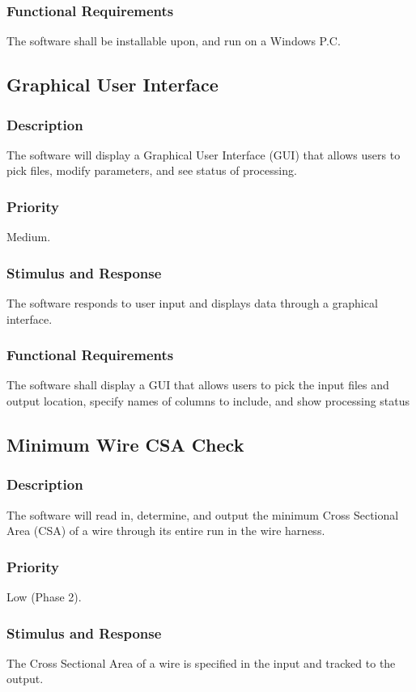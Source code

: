 \subsubsection{Functional Requirements}
The software shall be installable upon, and run on a Windows P.C.

  \subsection{Graphical User Interface}
\subsubsection{Description}
 The software will display a Graphical User Interface (GUI) that allows users to pick files, modify parameters, and see status of processing. 
\subsubsection{Priority}
Medium.

\subsubsection{Stimulus and Response}
The software responds to user input and displays data through a graphical interface.

\subsubsection{Functional Requirements}
The software shall display a GUI that allows users to pick the input files and output location, specify names of columns to include, and show processing status
 
  \subsection{Minimum Wire CSA Check}
\subsubsection{Description}
 The software will read in, determine, and output the minimum Cross Sectional Area (CSA) of a wire through its entire run in the wire harness.
\subsubsection{Priority}
Low (Phase 2).

\subsubsection{Stimulus and Response}
The Cross Sectional Area of a wire is specified in the input and tracked to the output.

